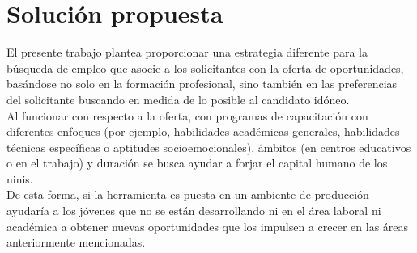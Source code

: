 \section{Solución propuesta}

El presente trabajo plantea proporcionar una estrategia diferente para la búsqueda de empleo que asocie a los solicitantes con la oferta de oportunidades, basándose no solo en la formación profesional, sino también en las preferencias del solicitante buscando en medida de lo posible al candidato idóneo.\\

Al funcionar con respecto a la oferta, con programas de capacitación con diferentes enfoques (por ejemplo, habilidades académicas generales, habilidades técnicas específicas o aptitudes socioemocionales), ámbitos (en centros educativos o en el trabajo) y duración se busca ayudar a forjar el capital humano de los ninis.\\

De esta forma, si la herramienta es puesta en un ambiente de producción ayudaría a los jóvenes que no se están desarrollando ni en el área laboral ni académica a obtener nuevas oportunidades que los impulsen a crecer en las áreas anteriormente mencionadas.
\bigskip
